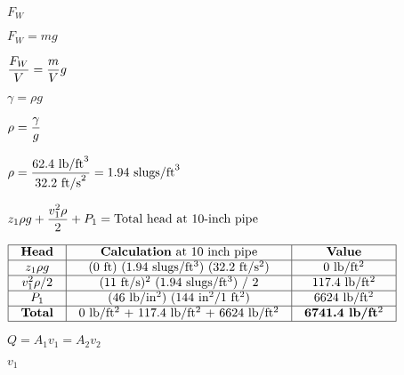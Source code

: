 \documentclass[12pt,a4paper,margin=2cm]{book}
\def\lthtmlcheckvsize{\ifdim\ht\sizebox<\vsize 
  \ifdim\wd\sizebox<\hsize\expandafter\hfill\fi \expandafter\vfill
  \else\expandafter\vss\fi}%
\begin{document}
{\newpage\clearpage
{}%
$ F_W$%
\lthtmlindisplaymathZ
\lthtmlcheckvsize\clearpage}

{\newpage\clearpage
{}%
$\displaystyle F_W = mg$%
\lthtmlindisplaymathZ
\lthtmlcheckvsize\clearpage}

{\newpage\clearpage
{}%
$\displaystyle {F_W \over V} = {m \over V} g$%
\lthtmlindisplaymathZ
\lthtmlcheckvsize\clearpage}

{\newpage\clearpage
{}%
$\displaystyle \gamma = \rho g$%
\lthtmlindisplaymathZ
\lthtmlcheckvsize\clearpage}

{\newpage\clearpage
{}%
$\displaystyle \rho = {\gamma \over g}$%
\lthtmlindisplaymathZ
\lthtmlcheckvsize\clearpage}

{\newpage\clearpage
{}%
$\displaystyle \rho = {62.4 \hbox{ lb/ft}^3 \over 32.2 \hbox{ ft/s}^2} = 1.94 \hbox{ slugs/ft}^3$%
\lthtmlindisplaymathZ
\lthtmlcheckvsize\clearpage}

{\newpage\clearpage
{}%
$\displaystyle z_1 \rho g + {v_1^2 \rho \over 2} + P_1 = \hbox{Total head at 10-inch pipe}$%
\lthtmlindisplaymathZ
\lthtmlcheckvsize\clearpage}

{\newpage\clearpage
{}%
$\displaystyle \vbox{\offinterlineskip
\halign{\strut
\vrule \quad\hfil # \  \hfil & 
\vrule \quad\hfil # \  \hfil & 
\vrule \quad\hfil # \  \hfil \vrule \cr
\noalign{\hrule }
\textbf{Head} & \textbf{Calculation} at 10 inch pipe & \textbf{Value} \cr
\noalign{\hrule }
$z_1 \rho g$ & (0 ft) (1.94 slugs/ft$^{3}$) (32.2 ft/s$^{2}$) & 0 lb/ft$^{2}$ \cr
\noalign{\hrule }
$v_1^2 \rho / 2$ & (11 ft/s)$^{2}$ (1.94 slugs/ft$^{3}$) / 2 & 117.4 lb/ft$^{2}$ \cr
\noalign{\hrule }
$P_1$ & (46 lb/in$^{2}$) (144 in$^{2}$/1 ft$^{2}$) & 6624 lb/ft$^{2}$ \cr
\noalign{\hrule }
\textbf{Total} &  0 lb/ft$^{2}$ + 117.4 lb/ft$^{2}$ + 6624 lb/ft$^{2}$ & \textbf{6741.4 lb/ft$^{2}$} \cr
\noalign{\hrule }
} %
}$%
\lthtmlindisplaymathZ
\lthtmlcheckvsize\clearpage}

{\newpage\clearpage
{}%
$\displaystyle Q = A_1 v_1 = A_2 v_2$%
\lthtmlindisplaymathZ
\lthtmlcheckvsize\clearpage}

{\newpage\clearpage
{}%
$ v_1$%
\lthtmlindisplaymathZ
\lthtmlcheckvsize\clearpage}
\end{document}
